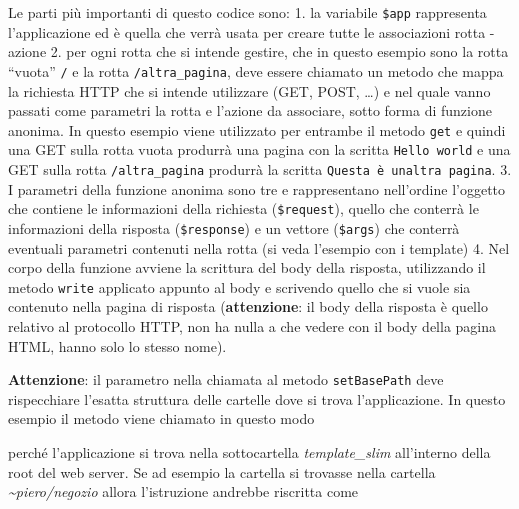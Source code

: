 Le parti più importanti di questo codice sono: 1. la variabile
\texttt{\$app} rappresenta l'applicazione ed è quella che verrà usata
per creare tutte le associazioni rotta - azione 2. per ogni rotta che si
intende gestire, che in questo esempio sono la rotta ``vuota''
\texttt{/} e la rotta \texttt{/altra\_pagina}, deve essere chiamato un
metodo che mappa la richiesta HTTP che si intende utilizzare (GET, POST,
\ldots) e nel quale vanno passati come parametri la rotta e l'azione da
associare, sotto forma di funzione anonima. In questo esempio viene
utilizzato per entrambe il metodo \texttt{get} e quindi una GET sulla
rotta vuota produrrà una pagina con la scritta \texttt{Hello\ world} e
una GET sulla rotta \texttt{/altra\_pagina} produrrà la scritta
\texttt{Questa\ è\ un\textquotesingle{}altra\ pagina}. 3. I parametri
della funzione anonima sono tre e rappresentano nell'ordine l'oggetto
che contiene le informazioni della richiesta (\texttt{\$request}),
quello che conterrà le informazioni della risposta (\texttt{\$response})
e un vettore (\texttt{\$args}) che conterrà eventuali parametri
contenuti nella rotta (si veda l'esempio con i template) 4. Nel corpo
della funzione avviene la scrittura del body della risposta, utilizzando
il metodo \texttt{write} applicato appunto al body e scrivendo quello
che si vuole sia contenuto nella pagina di risposta
(\textbf{attenzione}: il body della risposta è quello relativo al
protocollo HTTP, non ha nulla a che vedere con il body della pagina
HTML, hanno solo lo stesso nome).

\textbf{Attenzione}: il parametro nella chiamata al metodo
\texttt{setBasePath} deve rispecchiare l'esatta struttura delle cartelle
dove si trova l'applicazione. In questo esempio il metodo viene chiamato
in questo modo

\begin{Shaded}
\begin{Highlighting}[]
\NormalTok{)}\OtherTok{;}
\end{Highlighting}
\end{Shaded}

perché l'applicazione si trova nella sottocartella \emph{template\_slim}
all'interno della root del web server. Se ad esempio la cartella si
trovasse nella cartella \emph{\textasciitilde piero/negozio} allora
l'istruzione andrebbe riscritta come

\begin{Shaded}
\begin{Highlighting}[]
\NormalTok{)}\OtherTok{;}
\end{Highlighting}
\end{Shaded}

